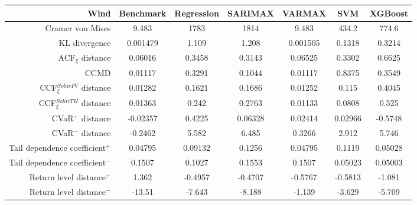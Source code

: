 \newpage
\begin{table}[ht]
    \footnotesize
    \begin{tabular}[l]{r|c|ccc|cc|}
        \toprule
        \textbf{Wind} &Benchmark&Regression&SARIMAX&VARMAX&SVM&XGBoost \\ 
        \midrule            
        Cramer von Mises&9.483&1783&1814&9.483&434.2&774.6 \\
        KL divergence&0.001479&1.109&1.208&0.001505&0.1318&0.3214 \\
        ACF$_\xi$ distance&0.06016&0.3458&0.3143&0.06525&0.3302&0.6625 \\
        \midrule
        CCMD&0.01117&0.3291&0.1044&0.01117&0.8375&0.3549 \\
        CCF$_\xi^{Solar PV}$ distance&0.01282&0.1621&0.1686&0.01252&0.115&0.4045 \\
        CCF$_\xi^{Solar TH}$ distance&0.01363&0.242&0.2763&0.01133&0.0808&0.525 \\
        \midrule
        CVaR$^+$ distance&-0.02357&0.4225&0.06328&0.02414&0.02966&-0.5748 \\
        CVaR$^-$ distance&-0.2462&5.582&6.485&0.3266&2.912&5.746 \\
        Tail dependence coefficient$^+$&0.04795&0.09132&0.1256&0.04795&0.1119&0.05028 \\
        Tail dependence coefficient$^-$&0.1507&0.1027&0.1553&0.1507&0.05023&0.05003 \\
        Return level distance$^+$&1.362&-0.4957&-0.4707&-0.5767&-0.5813&-1.081 \\
        Return level distance$^-$&-13.51&-7.643&-8.188&-1.139&-3.629&-5.709 \\
        \bottomrule
    \end{tabular}
\end{table}
